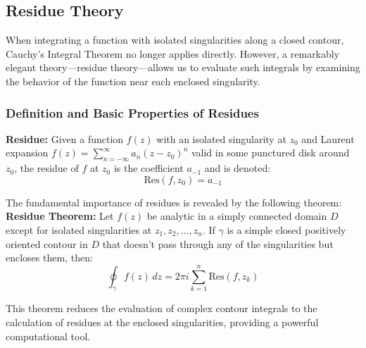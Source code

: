 \subsection*{Residue Theory} 

\noindent When integrating a function with isolated singularities along a closed contour, Cauchy's Integral Theorem no longer applies directly. However, a remarkably elegant theory—residue theory—allows us to evaluate such integrals by examining the behavior of the function near each enclosed singularity.

\subsubsection*{Definition and Basic Properties of Residues} 

\noindent \textbf{Residue:} Given a function $f(z)$ with an isolated singularity at $z_0$ and Laurent expansion $f(z) = \sum_{n=-\infty}^{\infty} a_n (z - z_0)^n$ valid in some punctured disk around $z_0$, the residue of $f$ at $z_0$ is the coefficient $a_{-1}$ and is denoted:
\[
\text{Res}(f, z_0) = a_{-1}
\]

\noindent The fundamental importance of residues is revealed by the following theorem: \\

\noindent \textbf{Residue Theorem:}  Let $f(z)$ be analytic in a simply connected domain $D$ except for isolated singularities at $z_1, z_2, \ldots, z_n$. If $\gamma$ is a simple closed positively oriented contour in $D$ that doesn't pass through any of the singularities but encloses them, then:
\[
\oint_{\gamma} f(z) \, dz = 2\pi i \sum_{k=1}^{n} \text{Res}(f, z_k)
\]

\noindent This theorem reduces the evaluation of complex contour integrals to the calculation of residues at the enclosed singularities, providing a powerful computational tool.

